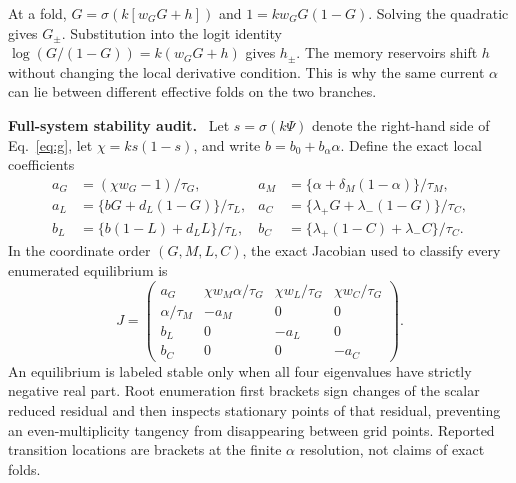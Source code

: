 \documentclass[pdflatex,sn-mathphys-num]{sn-jnl}
\newcommand{\inlinehead}[1]{\par\smallskip\noindent\textbf{#1}\ }
\begin{document}
\begin{appendices}
At a fold, $G=\sigma(k[w_GG+h])$ and $1=kw_GG(1-G)$. Solving the quadratic gives $G_\pm$. Substitution into the logit identity $\log(G/(1-G))=k(w_GG+h)$ gives $h_\pm$. The memory reservoirs shift $h$ without changing the local derivative condition. This is why the same current $\alpha$ can lie between different effective folds on the two branches.

\inlinehead{Full-system stability audit.} Let $s=\sigma(k\Psi)$ denote the right-hand side of Eq.~\eqref{eq:g}, let $\chi=ks(1-s)$, and write $b=b_0+b_\alpha\alpha$. Define the exact local coefficients
\begin{align}
a_G&=(\chi w_G-1)/\tau_G,
&a_M&=\{\alpha+\delta_M(1-\alpha)\}/\tau_M,\nonumber\\
a_L&=\{bG+d_L(1-G)\}/\tau_L,
&a_C&=\{\lambda_+G+\lambda_-(1-G)\}/\tau_C,\nonumber\\
b_L&=\{b(1-L)+d_LL\}/\tau_L,
&b_C&=\{\lambda_+(1-C)+\lambda_-C\}/\tau_C.\nonumber
\end{align}
In the coordinate order $(G,M,L,C)$, the exact Jacobian used to classify every enumerated equilibrium is
\begin{equation}
J=
\begin{pmatrix}
a_G & \chi w_M\alpha/\tau_G & \chi w_L/\tau_G & \chi w_C/\tau_G\\
\alpha/\tau_M & -a_M & 0 & 0\\
b_L & 0 & -a_L & 0\\
b_C & 0 & 0 & -a_C
\end{pmatrix}.
\label{eq:full-jacobian}
\end{equation}
An equilibrium is labeled stable only when all four eigenvalues have strictly negative real part. Root enumeration first brackets sign changes of the scalar reduced residual and then inspects stationary points of that residual, preventing an even-multiplicity tangency from disappearing between grid points. Reported transition locations are brackets at the finite $\alpha$ resolution, not claims of exact folds.


\end{appendices}
\end{document}
